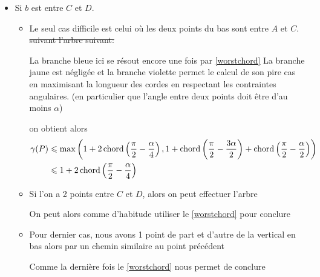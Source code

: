 \begin{itemize}
\begin{itemize}
\end{itemize}

\item \label{3cas2} Si $b$ est entre $C$ et $D$.

\begin{itemize}

\item \label{3cas21} Le seul cas difficile est celui où les deux points du bas sont entre $A$ et $C$.
\st{suivant l'arbre suivant:} 

La branche bleue ici se résout encore une fois par \ref{worstchord}
La branche jaune est négligée
et la branche violette permet le calcul de son pire cas en maximisant la longueur des cordes en respectant les contraintes angulaires. (en particulier que l'angle entre deux points doit être d'au moins $\alpha$)

on obtient alors
\begin{align*}
\gamma(P) &\leqslant \max\left(1+2\operatorname{chord}\left(\frac{\pi}{2} - \frac{\alpha}{4}\right), 1 + \operatorname{chord}\left(\frac{\pi}{2} - \frac{3\alpha}{2}\right) + \operatorname{chord}\left(\frac{\pi}{2} - \frac{\alpha}{2}\right)\right) \\
&\leqslant 1+2\operatorname{chord}\left(\frac{\pi}{2} - \frac{\alpha}{4}\right)
\end{align*}

\item \label{3cas22} Si l'on a 2 points entre $C$ et $D$, alors on peut
  effectuer l'arbre 

On peut alors comme d'habitude utiliser le \cref{worstchord} pour conclure

\item \label{3cas23} Pour dernier cas, nous avons 1 point de part et d'autre de
  la vertical en bas alors par un chemin similaire au point précédent 


Comme la dernière fois le \cref{worstchord} nous permet de conclure

\end{itemize}
\end{itemize}

